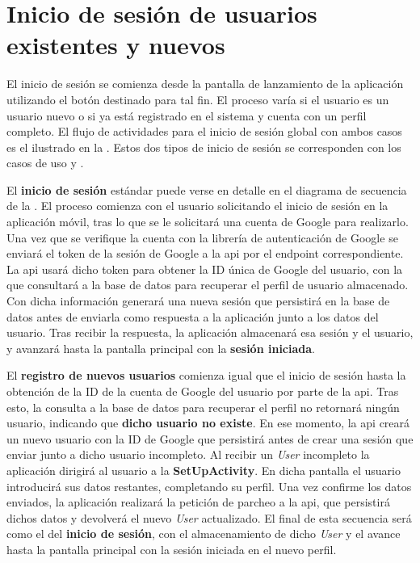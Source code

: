 \section{Inicio de sesión de usuarios existentes y nuevos}

El inicio de sesión se comienza desde la pantalla de lanzamiento de la aplicación utilizando el botón destinado para tal fin. El proceso varía si el usuario es un usuario nuevo o si ya está registrado en el sistema y cuenta con un perfil completo. El flujo de actividades para el inicio de sesión global con ambos casos es el ilustrado en la . Estos dos tipos de inicio de sesión se corresponden con los casos de uso \textbf{} y \textbf{}. 

El \textbf{inicio de sesión} estándar puede verse en detalle en el diagrama de secuencia de la . El proceso comienza con el usuario solicitando el inicio de sesión en la aplicación móvil, tras lo que se le solicitará una cuenta de Google para realizarlo. Una vez que se verifique la cuenta con la librería de autenticación de Google se enviará el \gls{token} de la sesión de Google a la \acrshort{api} por el \gls{endpoint} correspondiente. La \acrshort{api} usará dicho \gls{token} para obtener la ID única de Google del usuario, con la que consultará a la base de datos para recuperar el perfil de usuario almacenado. Con dicha información generará una nueva sesión que persistirá en la base de datos antes de enviarla como respuesta a la aplicación junto a los datos del usuario. Tras recibir la respuesta, la aplicación almacenará esa sesión y el usuario, y avanzará hasta la pantalla principal con la \textbf{sesión iniciada}. 

El \textbf{registro de nuevos usuarios} comienza igual que el inicio de sesión hasta la obtención de la ID de la cuenta de Google del usuario por parte de la \acrshort{api}. Tras esto, la consulta a la base de datos para recuperar el perfil no retornará ningún usuario, indicando que \textbf{dicho usuario no existe}. En ese momento, la \acrshort{api} creará un nuevo usuario con la ID de Google que persistirá antes de crear una sesión que enviar junto a dicho usuario incompleto. Al recibir un \emph{User} incompleto la aplicación dirigirá al usuario a la \textbf{SetUpActivity}. En dicha pantalla el usuario introducirá sus datos restantes, completando su perfil. Una vez confirme los datos enviados, la aplicación realizará la petición de parcheo a la \acrshort{api}, que persistirá dichos datos y devolverá el nuevo \emph{User} actualizado. El final de esta secuencia será como el del \textbf{inicio de sesión}, con el almacenamiento de dicho \emph{User} y el avance hasta la pantalla principal con la sesión iniciada en el nuevo perfil.

